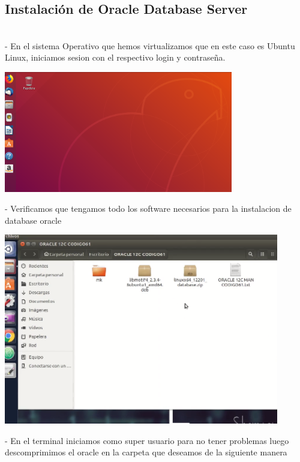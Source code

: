 \documentclass[12pt,letterpaper]{article}
\begin{document}
\begin{itemize}
\subsection{Instalación de Oracle Database Server}\\
- En el sistema Operativo que hemos virtualizamos que en este caso es Ubuntu Linux, iniciamos sesion con el respectivo login y contraseña.
\end{itemize}

\begin{center}
	\includegraphics[width=10cm]{./Imagenes/22} 
\end{center}


\begin{itemize}
- Verificamos que tengamos todo los software necesarios para la instalacion de database oracle\\
\end{itemize}

\begin{center}
	\includegraphics[width=12cm]{./Imagenes/23} 
\end{center}



\begin{itemize}
- En el terminal iniciamos como super usuario para no tener problemas luego descomprimimos el oracle en la carpeta que deseamos de la siguiente manera\\
\end{itemize}
\end{document}

